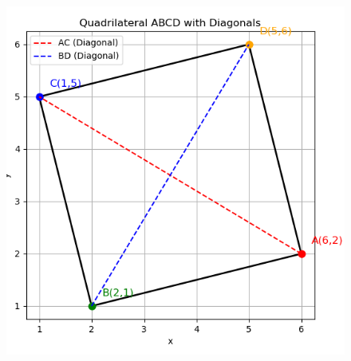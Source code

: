 \documentclass[journal,12pt,onecolumn]{IEEEtran}
\begin{document}
      \begin{figure}[H]
          \centering
          \includegraphics[width=0.7\linewidth]{figs/fig1.png}
	      \caption{}
	      \label{fig}
      \end{figure}
\end{document}
